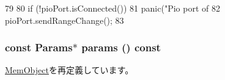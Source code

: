 \begin{DoxyCode}
79 {
80     if (!pioPort.isConnected())
81         panic("Pio port of %
82     pioPort.sendRangeChange();
83 }
\end{DoxyCode}
\hypertarget{classPioDevice_acd3c3feb78ae7a8f88fe0f110a718dff}{
\subsubsection[{params}]{\setlength{\rightskip}{0pt plus 5cm}const {\bf Params}$\ast$ params () const}}
\label{classPioDevice_acd3c3feb78ae7a8f88fe0f110a718dff}


\hyperlink{classMemObject_acd3c3feb78ae7a8f88fe0f110a718dff}{MemObject}を再定義しています。

